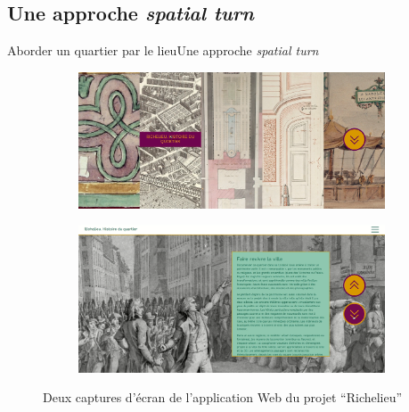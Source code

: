 \documentclass[8pt]{beamer}
\begin{document}
\subsection[Une approche \textit{spatial turn}]{Une approche \textit{spatial turn}}
\begin{frame}{Aborder un quartier par le lieu}{Une approche \textit{spatial turn}}
	\begin{figure}
		\centering
		\begin{subfigure}{0.7\textwidth}
			\includegraphics[width=\textwidth]{includes/app_1.png}
		\end{subfigure}
		\begin{subfigure}{0.7\textwidth}
			\includegraphics[width=\textwidth]{includes/app_2.png}
		\end{subfigure}
		\caption{Deux captures d'écran de l'application Web du projet \enquote{Richelieu}}
	\end{figure}
\end{frame}

\end{document}
